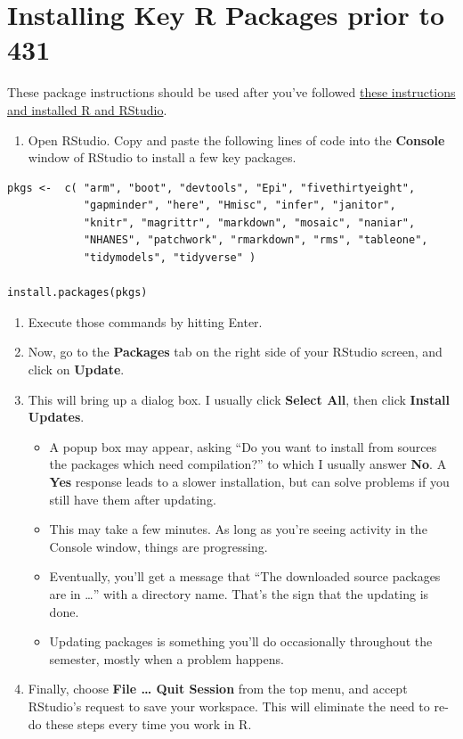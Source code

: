 \documentclass[
]{book}
\providecommand{\tightlist}{%
  \setlength{\itemsep}{0pt}\setlength{\parskip}{0pt}}
\begin{document}
\hypertarget{installing-key-r-packages-prior-to-431}{%
\chapter{Installing Key R Packages prior to 431}\label{installing-key-r-packages-prior-to-431}}

These package instructions should be used after you've followed \href{software.html}{these instructions and installed R and RStudio}.

\begin{enumerate}
\def\labelenumi{\arabic{enumi}.}
\tightlist
\item
  Open RStudio. Copy and paste the following lines of code into the \textbf{Console} window of RStudio to install a few key packages.
\end{enumerate}

\begin{verbatim}
pkgs <-  c( "arm", "boot", "devtools", "Epi", "fivethirtyeight",
            "gapminder", "here", "Hmisc", "infer", "janitor",
            "knitr", "magrittr", "markdown", "mosaic", "naniar",
            "NHANES", "patchwork", "rmarkdown", "rms", "tableone", 
            "tidymodels", "tidyverse" )
            
install.packages(pkgs)
\end{verbatim}

\begin{enumerate}
\def\labelenumi{\arabic{enumi}.}
\setcounter{enumi}{1}
\item
  Execute those commands by hitting Enter.
\item
  Now, go to the \textbf{Packages} tab on the right side of your RStudio screen, and click on \textbf{Update}.
\item
  This will bring up a dialog box. I usually click \textbf{Select All}, then click \textbf{Install Updates}.

  \begin{itemize}
  \tightlist
  \item
    A popup box may appear, asking ``Do you want to install from sources the packages which need compilation?'' to which I usually answer \textbf{No}. A \textbf{Yes} response leads to a slower installation, but can solve problems if you still have them after updating.
  \item
    This may take a few minutes. As long as you're seeing activity in the Console window, things are progressing.
  \item
    Eventually, you'll get a message that ``The downloaded source packages are in \ldots{}'' with a directory name. That's the sign that the updating is done.
  \item
    Updating packages is something you'll do occasionally throughout the semester, mostly when a problem happens.
  \end{itemize}
\item
  Finally, choose \textbf{File \ldots{} Quit Session} from the top menu, and accept RStudio's request to save your workspace. This will eliminate the need to re-do these steps every time you work in R.
\end{enumerate}
\end{document}
